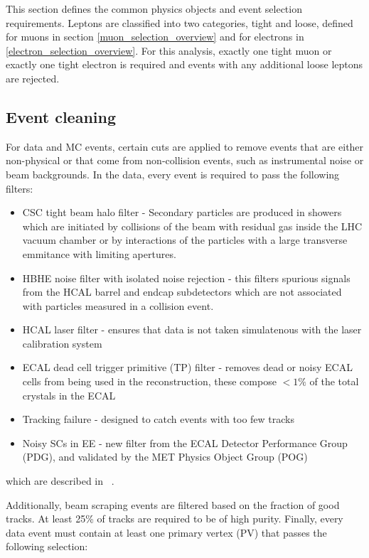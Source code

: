 \par This section defines the common physics objects and event
selection requirements.  Leptons are classified into two categories,
tight and loose, defined for muons in section
\ref{muon_selection_overview} and for electrons in
\ref{electron_selection_overview}.  For this analysis, exactly one
tight muon or exactly one tight electron is required and events with
any additional loose leptons are rejected. 


\subsection{Event cleaning}
\label{event_cleaning_overview}

\par For data and MC events, certain cuts are applied to remove events
that are either non-physical or that come from non-collision events,
such as instrumental noise or beam backgrounds.  In the data, every
event is required to pass the following filters:

\begin{itemize}
  \item CSC tight beam halo filter - Secondary particles are produced
    in showers which are initiated by collisions of the beam with
    residual gas inside the LHC vacuum chamber or by interactions of
    the particles with a large transverse emmitance with limiting
    apertures.   
  \item HBHE noise filter with isolated noise rejection - this filters
    spurious signals from the HCAL barrel and endcap subdetectors which
    are not associated with particles measured in a collision event. 
  \item HCAL laser filter - ensures that data is not taken
    simulatenous with the laser calibration system
  \item ECAL dead cell trigger primitive (TP) filter - removes dead
    or noisy ECAL cells from being used in the reconstruction, these
    compose $<1\%$ of the total crystals in the ECAL
  \item Tracking failure - designed to catch events with too few tracks
  \item Noisy SCs in EE - new filter from the ECAL Detector
    Performance Group (PDG), and validated by the MET Physics Object
    Group (POG)
\end{itemize}

\noindent which are described in ~\cite{METfilters}.

\par Additionally, beam scraping events are filtered based on the fraction
of good tracks.  At least 25\% of tracks are required to be of high
purity.  Finally, every data event must contain at least one primary
vertex (PV) that passes the following selection:

